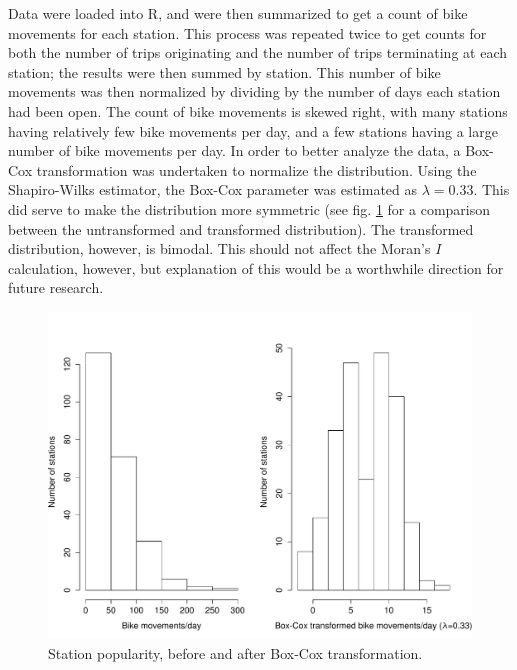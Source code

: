 \documentclass[letterpaper,11pt]{article}
\begin{document}
Data were loaded into R, and were then summarized to get a count of
bike movements for each station. This process was repeated twice to
get counts for both the number of trips originating and the number of
trips terminating at each station; the results were then summed by
station. This number of bike movements was then normalized by dividing
by the number of days each station had been open. The count of bike
movements is skewed right, with many stations having relatively few
bike movements per day, and a few stations having a large number of
bike movements per day. In order to better analyze the data, a Box-Cox
transformation was undertaken to normalize the distribution. Using the
Shapiro-Wilks estimator, the Box-Cox parameter was estimated as
$\lambda = 0.33$. This did serve to make the distribution more
symmetric (see fig. \ref{fig:boxcox} for a comparison between the
untransformed and transformed distribution). The transformed
distribution, however, is bimodal. This should not affect the Moran's
$I$ calculation, however, but explanation of this would be a
worthwhile direction for future research.

\begin{figure}[t]
  \includegraphics[width=\textwidth]{boxcox.pdf}
  \caption{\label{fig:boxcox}Station popularity, before and after Box-Cox transformation.}
\end{figure}
\end{document}
